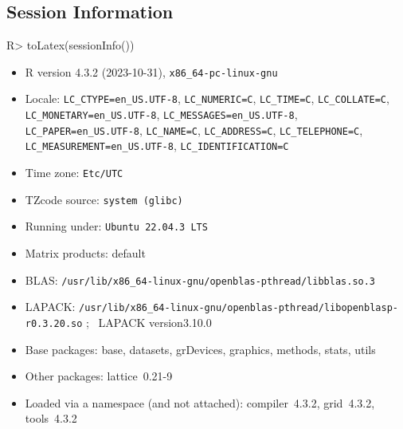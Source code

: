 \documentclass{article}
\begin{document}
\subsection*{Session Information}

\begin{Schunk}
\begin{Sinput}
R> toLatex(sessionInfo())
\end{Sinput}
\begin{itemize}\raggedright
  \item R version 4.3.2 (2023-10-31), \verb|x86_64-pc-linux-gnu|
  \item Locale: \verb|LC_CTYPE=en_US.UTF-8|, \verb|LC_NUMERIC=C|, \verb|LC_TIME=C|, \verb|LC_COLLATE=C|, \verb|LC_MONETARY=en_US.UTF-8|, \verb|LC_MESSAGES=en_US.UTF-8|, \verb|LC_PAPER=en_US.UTF-8|, \verb|LC_NAME=C|, \verb|LC_ADDRESS=C|, \verb|LC_TELEPHONE=C|, \verb|LC_MEASUREMENT=en_US.UTF-8|, \verb|LC_IDENTIFICATION=C|
  \item Time zone: \verb|Etc/UTC|
  \item TZcode source: \verb|system (glibc)|
  \item Running under: \verb|Ubuntu 22.04.3 LTS|
  \item Matrix products: default
  \item BLAS:   \verb|/usr/lib/x86_64-linux-gnu/openblas-pthread/libblas.so.3|
  \item LAPACK: \verb|/usr/lib/x86_64-linux-gnu/openblas-pthread/libopenblasp-r0.3.20.so|
; \quad\ LAPACK version3.10.0
  \item Base packages: base, datasets, grDevices, graphics,
    methods, stats, utils
  \item Other packages: lattice~0.21-9
  \item Loaded via a namespace (and not attached):
    compiler~4.3.2, grid~4.3.2, tools~4.3.2
\end{itemize}\end{Schunk}
\end{document}
